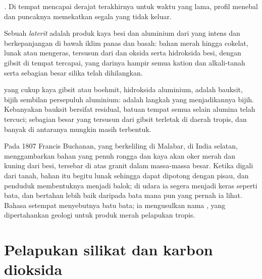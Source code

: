 \emph{.} Di tempat  mencapai derajat terakhirnya untuk waktu yang lama, profil menebal dan puncaknya memekatkan segala yang tidak keluar.

\begin{definition}[Laterit]\label{def:b1:weathering-clays:laterite}
Sebuah \emph{laterit} adalah produk kaya besi dan aluminium dari  yang intens dan berkepanjangan di bawah iklim panas dan basah: bahan merah hingga cokelat, lunak atau mengeras, tersusun dari  dan oksida serta hidroksida besi, dengan gibsit di tempat  tercapai, yang darinya hampir semua kation  dan alkali-tanah serta sebagian besar silika telah dihilangkan.
\end{definition}

 yang cukup kaya gibsit atau boehmit, hidroksida aluminium, adalah bauksit, bijih sembilan persepuluh aluminium:  adalah langkah yang menjadikannya bijih. Kebanyakan bauksit bersifat residual, batuan tempat semua selain alumina telah tercuci; sebagian besar yang tersusun dari gibsit terletak di daerah tropis, dan banyak di antaranya mungkin masih terbentuk.

\begin{history}
Pada 1807 Francis Buchanan, yang berkeliling di Malabar, di India selatan, menggambarkan bahan yang penuh rongga dan kaya akan oker merah dan kuning dari besi, tersebar di atas granit dalam massa-massa besar. Ketika digali dari tanah, bahan itu begitu lunak sehingga dapat dipotong dengan pisau, dan penduduk membentuknya menjadi balok; di udara ia segera menjadi keras seperti bata, dan bertahan lebih baik daripada bata mana pun yang pernah ia lihat. Bahasa setempat menyebutnya batu bata; ia mengusulkan nama , yang dipertahankan geologi untuk produk merah pelapukan tropis.
\end{history}

\section{Pelapukan silikat dan karbon dioksida}\label{sec:b1:weathering-clays:co2}

